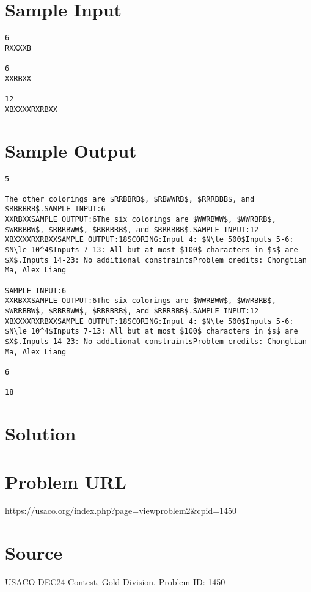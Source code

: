 \documentclass[12pt]{article}
\begin{document}
\section*{Sample Input}
\begin{verbatim}
6
RXXXXB

6
XXRBXX

12
XBXXXXRXRBXX
\end{verbatim}

\section*{Sample Output}
\begin{verbatim}
5

The other colorings are $RRBBRB$, $RBWWRB$, $RRRBBB$, and
$RBRBRB$.SAMPLE INPUT:6
XXRBXXSAMPLE OUTPUT:6The six colorings are $WWRBWW$, $WWRBRB$, $WRRBBW$, $RBRBWW$, $RBRBRB$, and $RRRBBB$.SAMPLE INPUT:12
XBXXXXRXRBXXSAMPLE OUTPUT:18SCORING:Input 4: $N\le 500$Inputs 5-6: $N\le 10^4$Inputs 7-13: All but at most $100$ characters in $s$ are
$X$.Inputs 14-23: No additional constraintsProblem credits: Chongtian Ma, Alex Liang

SAMPLE INPUT:6
XXRBXXSAMPLE OUTPUT:6The six colorings are $WWRBWW$, $WWRBRB$, $WRRBBW$, $RBRBWW$, $RBRBRB$, and $RRRBBB$.SAMPLE INPUT:12
XBXXXXRXRBXXSAMPLE OUTPUT:18SCORING:Input 4: $N\le 500$Inputs 5-6: $N\le 10^4$Inputs 7-13: All but at most $100$ characters in $s$ are
$X$.Inputs 14-23: No additional constraintsProblem credits: Chongtian Ma, Alex Liang

6

18
\end{verbatim}

\section*{Solution}


\section*{Problem URL}
https://usaco.org/index.php?page=viewproblem2&cpid=1450

\section*{Source}
USACO DEC24 Contest, Gold Division, Problem ID: 1450
\end{document}
